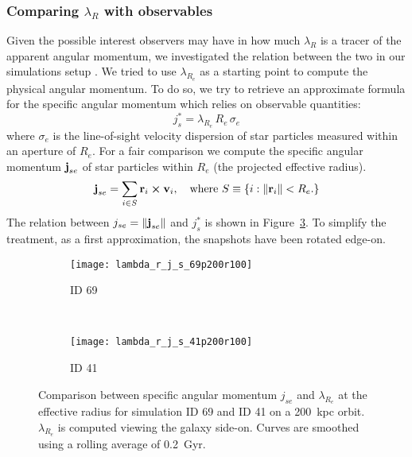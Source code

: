 \subsubsection{Comparing $\lambda_R$ with observables}

Given the possible interest observers may have in how much $\lambda_R$ is a tracer of the apparent angular momentum, we investigated the relation between the two in our simulations setup \citep[\cf{} the work of][]{Walo-Martin2020}.
We tried to use $\lambda_{R_e}$ as a starting point to compute the physical angular momentum.
To do so, we try to retrieve an approximate formula for the specific angular momentum which relies on observable quantities:
\begin{equation}
 j_s^* = \lambda_{R_e}\, R_e\, \sigma_e
 \label{eq:js*}
\end{equation}
where $\sigma_e$ is the line-of-sight velocity dispersion of star particles measured within an aperture of $R_e$.
For a fair comparison we compute the specific angular momentum $\boldsymbol{\mathbf{j}}_{se}$ of star particles within $R_e$ (the projected effective radius).
\begin{equation}
  \boldsymbol{\mathbf{j}}_{se} = \sum_{i\in S} \boldsymbol{\mathbf{r}}_i\cross\boldsymbol{\mathbf{v}}_i,\quad \text{where } S\equiv\{i: \norm{\boldsymbol{\mathbf{r}}_i} < R_e.\}
\end{equation}
The relation between $j_{se} = \norm{\boldsymbol{\mathbf{j}}_{se}}$ and $j_s^*$ is shown in Figure~\ref{fig:lambda_r_j_s_sigma}.
To simplify the treatment, as a first approximation, the snapshots have been rotated edge-on.

\begin{figure}
  \centering
  \begin{subfigure}[t]{0.93\textwidth}
  \centering
  \caption{ID 69}
  \label{fig:lambda_r_j_s_sigma_69}
  \texttt{[image: lambda\_r\_j\_s\_69p200r100]}
 \end{subfigure}\\
 \begin{subfigure}[t]{0.93\textwidth}
  \centering
  \caption{ID 41}
  \label{fig:lambda_r_j_s_sigma_41}
  \texttt{[image: lambda\_r\_j\_s\_41p200r100]}
 \end{subfigure}
  \caption{Comparison between specific angular momentum $j_{se}$ and $\lambda_{R_e}$ at the effective radius for simulation ID 69 and ID 41 on a 200~kpc orbit.
  $\lambda_{R_e}$ is computed viewing the galaxy side-on.
  Curves are smoothed using a rolling average of 0.2~Gyr.}
  \label{fig:lambda_r_j_s_sigma}
\end{figure}


